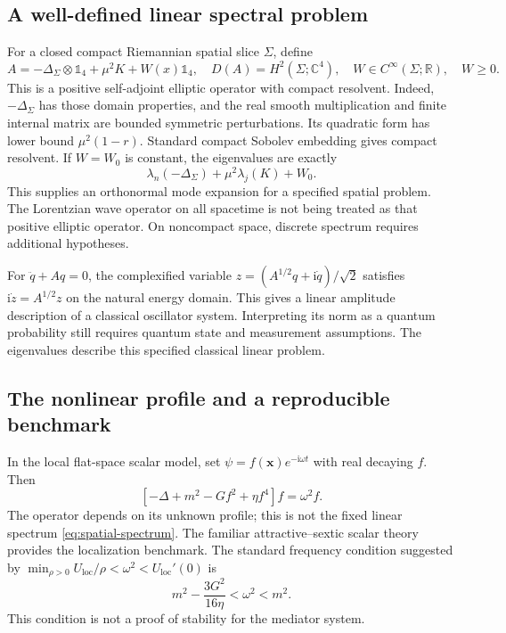 \documentclass[aip,adv,reprint,onecolumn,amsmath,amssymb]{revtex4-2}
\newcommand{\R}{\mathbb R}
\newcommand{\C}{\mathbb C}
\newcommand{\Id}{\mathbb 1}
\newcommand{\ii}{\mathrm i}
\begin{document}
\subsection{A well-defined linear spectral problem}
For a closed compact Riemannian spatial slice $\Sigma$, define
\begin{equation}
 A=-\Delta_\Sigma\otimes\Id_4+\mu^2K+W(x)\Id_4,
 \quad D(A)=H^2(\Sigma;\C^4),\quad W\in C^\infty(\Sigma;\R),\quad W\ge0.
 \label{eq:spatial-spectrum}
\end{equation}
This is a positive self-adjoint elliptic operator with compact resolvent.\cite{reed,rosenberg} Indeed, $-\Delta_\Sigma$ has those domain properties, and the real smooth multiplication and finite internal matrix are bounded symmetric perturbations. Its quadratic form has lower bound $\mu^2(1-r)$. Standard compact Sobolev embedding gives compact resolvent. If $W=W_0$ is constant, the eigenvalues are exactly
\begin{equation}
 \lambda_n(-\Delta_\Sigma)+\mu^2\lambda_j(K)+W_0.
 \label{eq:separated-spectrum}
\end{equation}
This supplies an orthonormal mode expansion for a specified spatial problem. The Lorentzian wave operator on all spacetime is not being treated as that positive elliptic operator. On noncompact space, discrete spectrum requires additional hypotheses.

For $\ddot q+Aq=0$, the complexified variable $z=(A^{1/2}q+\ii\dot q)/\sqrt2$ satisfies $\ii\dot z=A^{1/2}z$ on the natural energy domain. This gives a linear amplitude description of a classical oscillator system. Interpreting its norm as a quantum probability still requires quantum state and measurement assumptions. The eigenvalues describe this specified classical linear problem.

\subsection{The nonlinear profile and a reproducible benchmark}
In the local flat-space scalar model, set $\psi=f(\bm x)e^{-\ii\omega t}$ with real decaying $f$. Then
\begin{equation}
 \left[-\Delta+m^2-Gf^2+\eta f^4\right]f=\omega^2f.
 \label{eq:nonlinear-spectrum}
\end{equation}
The operator depends on its unknown profile; this is not the fixed linear spectrum \eqref{eq:spatial-spectrum}. The familiar attractive--sextic scalar theory provides the localization benchmark.\cite{coleman,nugaev} The standard frequency condition suggested by $\min_{\rho>0}U_{\mathrm{loc}}/\rho<\omega^2<U_{\mathrm{loc}}'(0)$ is
\begin{equation}
 m^2-\frac{3G^2}{16\eta}<\omega^2<m^2.
 \label{eq:frequency-window}
\end{equation}
This condition is not a proof of stability for the mediator system.
\end{document}
